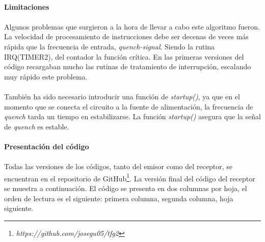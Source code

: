 \paragraph{Limitaciones}
\paragraph{}
Algunos problemas que surgieron a la hora de llevar a cabo este algoritmo fueron.
La velocidad de procesamiento de instrucciones debe ser decenas de veces más rápida que la frecuencia de entrada, \textit{quench-signal}. Siendo la rutina IRQ(TIMER2), del contador la función crítica.
En las primeras versiones del código recargaban mucho las rutinas de tratamiento de interrupción, escalando muy rápido este problema.
\paragraph{}
También ha sido necesario introducir una función de \textit{startup()}, ya que en el momento que se conecta el circuito a la fuente de alimentación, la frecuencia de \textit{quench} tarda un tiempo en estabilizarse. La función \textit{startup()} asegura que la señal de \textit{quench} es estable.


\paragraph{Presentaci\'on del c\'odigo}
\paragraph{}
Todas las versiones de los c\'odigos, tanto del emisor como del receptor, se encuentran en el repositorio de GitHub\footnote{\textit{https://github.com/josegu05/tfg2}}. La versi\'on final del c\'odigo del receptor se muestra a continuaci\'on. El c\'odigo se presenta en dos columnas por hoja, el orden de lectura es el siguiente: primera columna, segunda columna, hoja siguiente.

\begin{multicols}{2}

\end{multicols}
